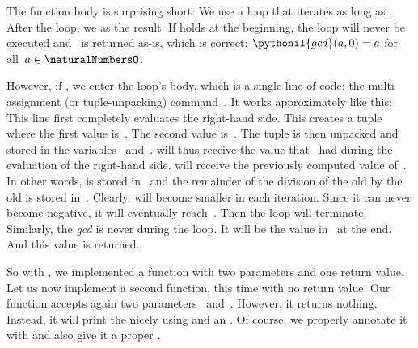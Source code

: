 The function body is surprising short:
We use a  loop that iterates as long as .
After the loop, we  as the result.
If  holds at the beginning, the loop will never be executed and~ is returned as-is, which is correct:
$\pythonil{gcd}(a, 0)=a$ for all~$a\in\naturalNumbersO$.

However, if , we enter the loop's body, which is a single line of code:
the multi-assignment (or tuple-unpacking) command~.
It works approximately like this:
This line first completely evaluates the right-hand side.
This creates a tuple where the first value is~.
The second value is~.
The tuple is then unpacked and stored in the variables~ and~.
 will thus receive the value that ~had during the evaluation of the right-hand side.
 will receive the previously computed value of~.
In other words,  is stored in~ and the remainder of the division of the old  by the old  is stored in~.
Clearly,  will become smaller in each iteration.
Since it can never become negative, it will eventually reach~.
Then the loop will terminate.
Similarly, the \emph{gcd} is never  during the loop.
It will be the value in~ at the end.
And this value is returned.

So with , we implemented a function with two parameters and one return value.
Let us now implement a second function, this time with no return value.
Our function  accepts again two parameters~ and~.
However, it returns nothing.
Instead, it will print the  nicely using  and an .
Of course, we properly annotate it with  and also give it a proper .

